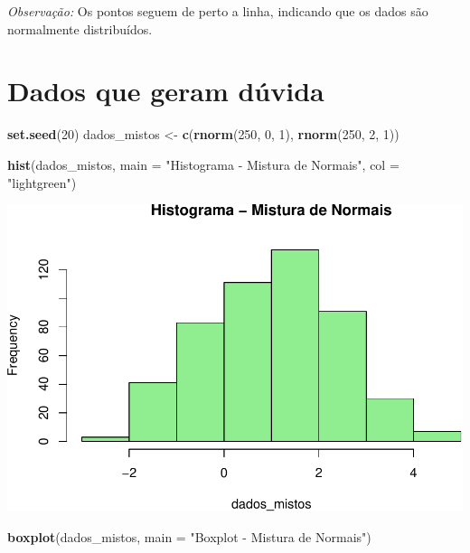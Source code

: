 \documentclass[
]{book}
\newenvironment{Shaded}{\begin{snugshade}}{\end{snugshade}}
\newcommand{\AttributeTok}[1]{\textcolor[rgb]{0.13,0.29,0.53}{#1}}
\newcommand{\DecValTok}[1]{\textcolor[rgb]{0.00,0.00,0.81}{#1}}
\newcommand{\FunctionTok}[1]{\textcolor[rgb]{0.13,0.29,0.53}{\textbf{#1}}}
\newcommand{\NormalTok}[1]{#1}
\newcommand{\OtherTok}[1]{\textcolor[rgb]{0.56,0.35,0.01}{#1}}
\newcommand{\StringTok}[1]{\textcolor[rgb]{0.31,0.60,0.02}{#1}}
\begin{document}
\emph{Observação:} Os pontos seguem de perto a linha, indicando que os dados são normalmente distribuídos.

\section{Dados que geram dúvida}\label{dados-que-geram-duxfavida}

\begin{Shaded}
\begin{Highlighting}[]
\FunctionTok{set.seed}\NormalTok{(}\DecValTok{20}\NormalTok{)}
\NormalTok{dados\_mistos }\OtherTok{\textless{}{-}} \FunctionTok{c}\NormalTok{(}\FunctionTok{rnorm}\NormalTok{(}\DecValTok{250}\NormalTok{, }\DecValTok{0}\NormalTok{, }\DecValTok{1}\NormalTok{), }\FunctionTok{rnorm}\NormalTok{(}\DecValTok{250}\NormalTok{, }\DecValTok{2}\NormalTok{, }\DecValTok{1}\NormalTok{))}

\FunctionTok{hist}\NormalTok{(dados\_mistos, }\AttributeTok{main =} \StringTok{"Histograma {-} Mistura de Normais"}\NormalTok{, }\AttributeTok{col =} \StringTok{"lightgreen"}\NormalTok{)}
\end{Highlighting}
\end{Shaded}

\includegraphics{LivroEstatisticaR_files/figure-latex/duvidosaDist-1.pdf}

\begin{Shaded}
\begin{Highlighting}[]
\FunctionTok{boxplot}\NormalTok{(dados\_mistos, }\AttributeTok{main =} \StringTok{"Boxplot {-} Mistura de Normais"}\NormalTok{)}
\end{Highlighting}
\end{Shaded}
\end{document}
